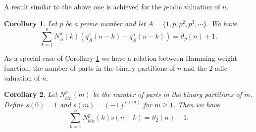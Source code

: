 \documentclass[11pt]{article}
\newtheorem{corollary}{Corollary}
\begin{document}
A result similar to the above one is achieved for the $p$-adic valuation of $n$.   
\begin{corollary}\label{cor-3-iden-2}
Let $p$ be a prime number and let $A=\{1,p,p^2,p^3,\cdots \}$. We have
\begin{equation}
\sum_{k=1}^nN^p_A(k)(q_A^e(n-k)-q_A^o(n-k))=\vartheta_p(n)+1.
\end{equation}
\end{corollary}
As a special case of Corollary \ref{cor-3-iden-2} we have a relation between Hamming weight function, the number of parts in the binary partitions of $n$ and the $2$-adic valuation of $n$.
\begin{corollary}
Let $N^p_{bin}(m)$ be the number of parts in the binary partitions of $m$. Define $s(0)=1$ and $s(m)=(-1)^{h(m)}$ for $m\geq 1$. Then we have 
\begin{equation}
\sum_{k=1}^{n}N^p_{bin}(k)s(n-k)=\vartheta_2(n)+1.
\end{equation}
\end{corollary}
\end{document}

